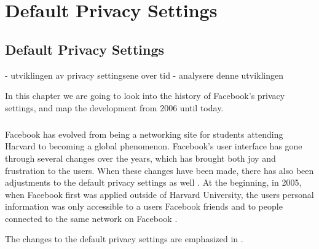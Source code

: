 \chapter{Default Privacy Settings}
\label{chp:defaultprivacysettings} 

\section{Default Privacy Settings}\label{sec:default_privacy_settings}
- utviklingen av privacy settingsene over tid
- analysere denne utviklingen

In this chapter we are going to look into the history of Facebook’s privacy settings, and map the development from 2006 until today. 

\paragraph{}
Facebook has evolved from being a networking site for students attending Harvard to becoming a global phenomenon. Facebook's user interface has gone through several changes over the years, which has brought both joy and frustration to the users. When these changes have been made, there has also been adjustments to the default privacy settings as well \cite{EvoPriv2}. At the beginning, in 2005, when Facebook first was applied outside of Harvard University, the users personal information was only accessible to a users Facebook friends and to people connected to the same network on Facebook \cite{EvoPriv}. 

The changes to the default privacy settings are emphasized in . 

